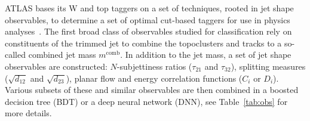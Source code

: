 ATLAS bases its W and top taggers on a set of techniques, rooted in jet shape observables, to determine a set of optimal cut-based taggers for use in physics analyses~\cite{Aaboud:2018psm, Aad:2016pux, Aad:2015rpa}. The first broad class of observables studied for classification rely on constituents of the trimmed jet to combine the topoclusters and tracks to a so-called combined jet mass $m^\mathrm{comb}$. In addition to the jet mass, a set of jet shape observables are constructed: $N$-subjettiness ratios ($\tau_{21}$ and $\tau_{32}$), splitting measures ($\sqrt{d_{12}}$ and $\sqrt{d_{23}}$), planar flow and energy correlation functions ($C_i$ or $D_i$). Various subsets of these and similar observables are then combined in a boosted decision tree (BDT) or a deep neural network (DNN), see Table~\ref{tab:obs} for more details.



